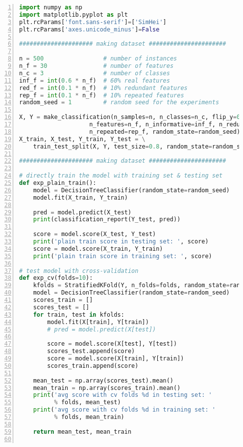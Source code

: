 \documentclass[12pt,a4paper]{article}
\theoremstyle{definition}
\begin{document}
\begin{appendix}
\begin{lstlisting}[language=Python,
	numbers=left,
	keywordstyle=\color{blue!70},
	frame=shadowbox,
	breaklines=True]
import numpy as np
import matplotlib.pyplot as plt
plt.rcParams['font.sans-serif']=['SimHei']
plt.rcParams['axes.unicode_minus']=False

##################### making dataset ######################

n = 500                 # number of instances
n_f = 30                # number of features
n_c = 3                 # number of classes
inf_f = int(0.6 * n_f)  # 60% real features
red_f = int(0.1 * n_f)  # 10% redundant features
rep_f = int(0.1 * n_f)  # 10% repeated features
random_seed = 1         # random seed for the experiments

X, Y = make_classification(n_samples=n, n_classes=n_c, flip_y=0.03,
                    n_features=n_f, n_informative=inf_f, n_redundant=red_f,
                    n_repeated=rep_f, random_state=random_seed)
X_train, X_test, Y_train, Y_test = \
    train_test_split(X, Y, test_size=0.8, random_state=random_seed)

##################### making dataset ######################

# directly train the model with training set & testing set
def exp_plain_train():
    model = DecisionTreeClassifier(random_state=random_seed)
    model.fit(X_train, Y_train)

    pred = model.predict(X_test)
    print(classification_report(Y_test, pred))

    score = model.score(X_test, Y_test)
    print('plain train score in testing set: ', score)
    score = model.score(X_train, Y_train)
    print('plain train score in training set: ', score)

# test model with cross-validation
def exp_cv(folds=10):
    kfolds = StratifiedKFold(Y, n_folds=folds, random_state=random_seed)
    model = DecisionTreeClassifier(random_state=random_seed)
    scores_train = []
    scores_test = []
    for train, test in kfolds:
        model.fit(X[train], Y[train])
        # pred = model.predict(X[test])

        score = model.score(X[test], Y[test])
        scores_test.append(score)
        score = model.score(X[train], Y[train])
        scores_train.append(score)

    mean_test = np.array(scores_test).mean()
    mean_train = np.array(scores_train).mean()
    print('avg score with cv folds %d in testing set: '
          % folds, mean_test)
    print('avg score with cv folds %d in training set: '
          % folds, mean_train)

    return mean_test, mean_train


\end{lstlisting}
\end{appendix}
\end{document}
